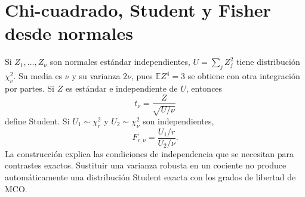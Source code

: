 \documentclass[11pt,a4paper]{article}
\newcommand{\E}{\mathbb E}
\theoremstyle{definition}
\begin{document}
\section{Chi-cuadrado, Student y Fisher desde normales}
Si $Z_1,\ldots,Z_\nu$ son normales estándar independientes, $U=\sum_jZ_j^2$ tiene distribución $\chi_\nu^2$. Su media es $\nu$ y su varianza $2\nu$, pues $\E Z^4=3$ se obtiene con otra integración por partes. Si $Z$ es estándar e independiente de $U$, entonces
\[
t_\nu=\frac Z{\sqrt{U/\nu}}
\]
define Student. Si $U_1\sim\chi_r^2$ y $U_2\sim\chi_\nu^2$ son independientes,
\[
F_{r,\nu}=\frac{U_1/r}{U_2/\nu}.
\]
La construcción explica las condiciones de independencia que se necesitan para contrastes exactos. Sustituir una varianza robusta en un cociente no produce automáticamente una distribución Student exacta con los grados de libertad de MCO.
\end{document}
